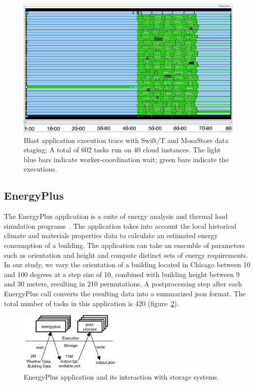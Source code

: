 \documentclass{sig-alternate}
\begin{document}
\begin{figure}[htb]
\begin{center}
\includegraphics[width=\linewidth]{plots/blast_timeline_40i_80c_new.png}
\caption{Blast application execution trace with Swift/T and MosaStore data
staging; A total of 602 tasks run on 40 cloud instances. The light blue
bars indicate worker-coordination wait; green bars indicate the
executions.
\label{fig_blast_t}
}
\end{center}
\end{figure}

\subsection{EnergyPlus}
The EnergyPlus application is a suite of energy analysis and thermal load
simulation programs~\cite{eplus}. The application takes into account the local
historical climate and materials properties data to calculate an estimated
energy consumption of a building. The application can
take an ensemble of parameters such as orientation and height and compute
distinct sets of energy requirements. In our study, we vary the orientation of
a building located in Chicago between 10 and 100 degrees at a step size of 10,
combined with building height between 9 and 30 meters, resulting in 210
permutations. A postprocessing step after each EnergyPlus call converts the
resulting data into a summarized json format. The total number of tasks in this
application is 420 (figure~\ref{fig_eplus}).

\begin{figure}[htb]
\begin{center}
\includegraphics[width=2in]{figures/eplus.png}
\caption{EnergyPlus application and its interaction with storage systems. 
\label{fig_eplus}
}
\end{center}
\end{figure}
\end{document}
